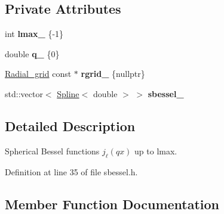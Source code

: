 \subsection*{Private Attributes}
\begin{DoxyCompactItemize}
\item 
\hypertarget{classsirius_1_1_spherical___bessel__functions_a512f37f9cb65d3000b596188f2434ade}{}int {\bfseries lmax\+\_\+} \{-\/1\}\label{classsirius_1_1_spherical___bessel__functions_a512f37f9cb65d3000b596188f2434ade}

\item 
\hypertarget{classsirius_1_1_spherical___bessel__functions_abc2cca6129b5cf88ae564f9376fbc23a}{}double {\bfseries q\+\_\+} \{0\}\label{classsirius_1_1_spherical___bessel__functions_abc2cca6129b5cf88ae564f9376fbc23a}

\item 
\hypertarget{classsirius_1_1_spherical___bessel__functions_a57fdf05d75ffe94b7561d2d86fcb5f5f}{}\hyperlink{classsirius_1_1_radial__grid}{Radial\+\_\+grid} const $\ast$ {\bfseries rgrid\+\_\+} \{nullptr\}\label{classsirius_1_1_spherical___bessel__functions_a57fdf05d75ffe94b7561d2d86fcb5f5f}

\item 
\hypertarget{classsirius_1_1_spherical___bessel__functions_a593c88e5b485daea9fa0fc4a99624c56}{}std\+::vector$<$ \hyperlink{classsirius_1_1_spline}{Spline}$<$ double $>$ $>$ {\bfseries sbessel\+\_\+}\label{classsirius_1_1_spherical___bessel__functions_a593c88e5b485daea9fa0fc4a99624c56}

\end{DoxyCompactItemize}


\subsection{Detailed Description}
Spherical Bessel functions $ j_{\ell}(q x) $ up to lmax. 

Definition at line 35 of file sbessel.\+h.



\subsection{Member Function Documentation}
\hypertarget{classsirius_1_1_spherical___bessel__functions_aa36401fd1a8bf553440aa916a0fd1216}{}
